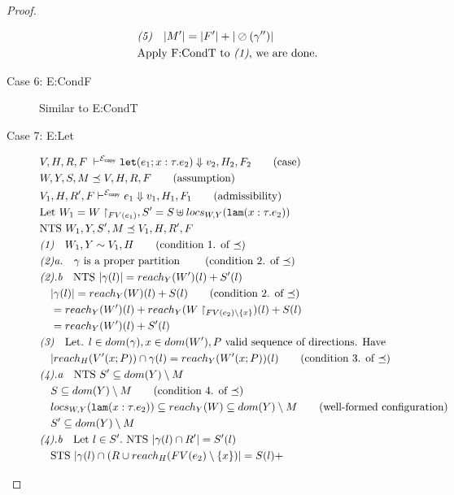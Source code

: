 \documentclass[11pt]{article}
\newcommand{\ms}[1]{\ensuremath{\mathsf{#1}}}
\newcommand{\irl}[1]{\mathtt{#1}}
\newcommand{\oh}[1]{\oslash(#1)}
\newcommand{\copySem}{\ensuremath{\mathcal{E}_{\ms{copy}}}}
\theoremstyle{definition}
\begin{document}
\begin{proof}
\begin{description}
\begin{align*}
		&\emph{(5)}\quad |M'| = |F'| + |\oh{\gamma''}|\\
		&\text{Apply F:CondT to \emph{(1)}, we are done.}
  \end{align*}
  \item[Case 6: E:CondF] 
  Similar to E:CondT
  \item[Case 7: E:Let]
  \begin{align*}
		&V,H,R,F \; \vdash^{\copySem} \irl{let}(e_1; x : \tau.e_2) \Downarrow v_2,H_2,F_2 \tag{case}\\
		&W,Y,S,M \preceq V,H,R,F \tag{assumption}\\
		&V_1,H,R',F \vdash^{\copySem} e_1 \Downarrow v_1,H_1,F_1 \tag{admissibility}\\
		&\text{Let } W_1 = W \restriction_{FV(e_1)}, S' = S \uplus locs_{W,Y}(\irl{lam}(x : \tau.e_2))\\
		&\text{NTS } W_1,Y,S',M \preceq V_1,H,R',F\\
		&\emph{(1)}\quad W_1,Y \sim V_1,H \tag{condition 1. of $\preceq$}\\
		&\emph{(2)a.}\quad \gamma \text{ is a proper partition } \tag{condition 2. of $\preceq$}\\
		&\emph{(2).b}\quad \text{NTS } |\gamma(l)| = reach_Y(W')(l) + S'(l)\\
		&\quad |\gamma(l)| = reach_Y(W)(l) + S(l) \tag{condition 2. of $\preceq$}\\
		&\quad = reach_Y(W')(l) + reach_Y(W\restriction_{FV(e_2)\setminus \{x\}})(l) + S(l)\\
		&\quad = reach_Y(W')(l) + S'(l)\\
		&\emph{(3)}\quad \text{Let. } l \in dom(\gamma), x \in dom(W'), P \text{ valid sequence of 
		directions. Have }\\
		&\quad |reach_H(V'(x;P)) \cap \gamma(l) = reach_Y(W'(x;P))(l) 
			\tag{condition 3. of $\preceq$}\\
		&\emph{(4).a}\quad \text{NTS } S' \subseteq dom(Y)\setminus M\\
		&\quad S \subseteq dom(Y)\setminus M \tag{condition 4. of $\preceq$}\\
		&\quad locs_{W,Y}(\irl{lam}(x : \tau.e_2)) \subseteq reach_Y(W) \subseteq dom(Y) \setminus M
			\tag{well-formed configuration}\\
		&\quad S' \subseteq dom(Y)\setminus M\\ 
		&\emph{(4).b}\quad \text{Let } l \in S'. \text{ NTS } |\gamma(l) \cap R'| = S'(l)\\
		&\quad \text{STS }  |\gamma(l) \cap (R \cup reach_H(FV(e_2) \setminus \{x\})| = S(l) + 

\end{align*}
\end{description}
\end{proof}
\end{document}
